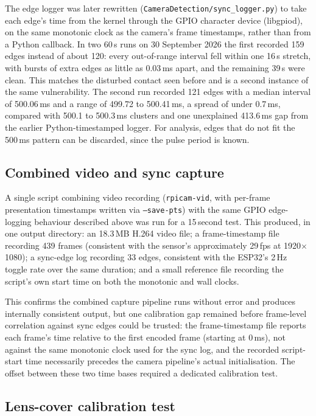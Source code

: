 The edge logger was later rewritten (\texttt{CameraDetection/sync\_logger.py}) to take each edge's time from the kernel through the GPIO character device (libgpiod), on the same monotonic clock as the camera's frame timestamps, rather than from a Python callback. In two 60\,s runs on 30 September 2026 the first recorded 159 edges instead of about 120: every out-of-range interval fell within one 16\,s stretch, with bursts of extra edges as little as 0.03\,ms apart, and the remaining 39\,s were clean. This matches the disturbed contact seen before and is a second instance of the same vulnerability. The second run recorded 121 edges with a median interval of 500.06\,ms and a range of 499.72 to 500.41\,ms, a spread of under 0.7\,ms, compared with 500.1 to 500.3\,ms clusters and one unexplained 413.6\,ms gap from the earlier Python-timestamped logger. For analysis, edges that do not fit the 500\,ms pattern can be discarded, since the pulse period is known.

\subsection{Combined video and sync capture}

A single script combining video recording (\texttt{rpicam-vid}, with per-frame presentation timestamps written via \texttt{--save-pts}) with the same GPIO edge-logging behaviour described above was run for a 15\,second test. This produced, in one output directory: an 18.3\,MB H.264 video file; a frame-timestamp file recording 439 frames (consistent with the sensor's approximately 29\,fps at 1920$\times$1080); a sync-edge log recording 33 edges, consistent with the ESP32's 2\,Hz toggle rate over the same duration; and a small reference file recording the script's own start time on both the monotonic and wall clocks.

This confirms the combined capture pipeline runs without error and produces internally consistent output, but one calibration gap remained before frame-level correlation against sync edges could be trusted: the frame-timestamp file reports each frame's time relative to the first encoded frame (starting at 0\,ms), not against the same monotonic clock used for the sync log, and the recorded script-start time necessarily precedes the camera pipeline's actual initialisation. The offset between these two time bases required a dedicated calibration test.

\subsection{Lens-cover calibration test}

